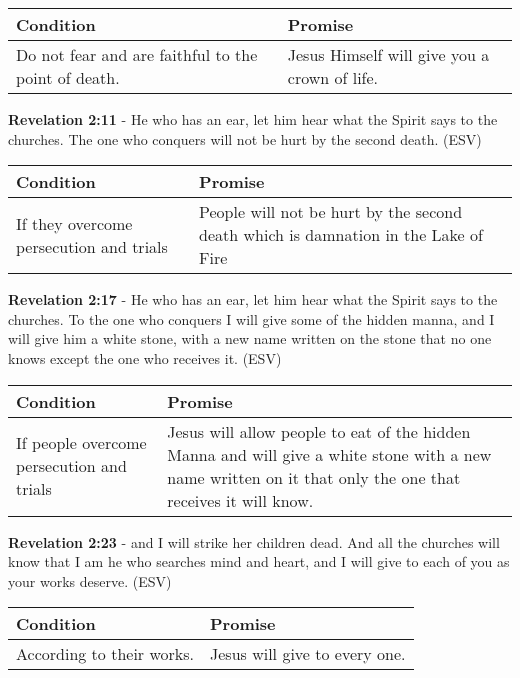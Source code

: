 \documentclass[11pt]{article}
\begin{document}
\begin{center}
\begin{tabular}{ll}
Condition & Promise\\[0pt]
\hline
Do not fear and are faithful to the point of death. & Jesus Himself will give you a crown of life.\\[0pt]
\end{tabular}
\end{center}

\textbf{Revelation 2:11} - He who has an ear, let him hear what the Spirit says to the churches. The one who conquers will not be hurt by the second death. (ESV)

\begin{center}
\begin{tabular}{ll}
Condition & Promise\\[0pt]
\hline
If they overcome persecution and trials & People will not be hurt by the second death which is damnation in the Lake of Fire\\[0pt]
\end{tabular}
\end{center}

\textbf{Revelation 2:17} - He who has an ear, let him hear what the Spirit says to the churches. To the one who conquers I will give some of the hidden manna, and I will give him a white stone, with a new name written on the stone that no one knows except the one who receives it. (ESV)

\begin{center}
\begin{tabular}{ll}
Condition & Promise\\[0pt]
\hline
If people overcome persecution and trials & Jesus will allow people to eat of the hidden Manna and will give a white stone with a new name written on it that only the one that receives it will know.\\[0pt]
\end{tabular}
\end{center}

\textbf{Revelation 2:23} - and I will strike her children dead. And all the churches will know that I am he who searches mind and heart, and I will give to each of you as your works deserve. (ESV)

\begin{center}
\begin{tabular}{ll}
Condition & Promise\\[0pt]
\hline
According to their works. & Jesus will give to every one.\\[0pt]
\end{tabular}
\end{center}
\end{document}
